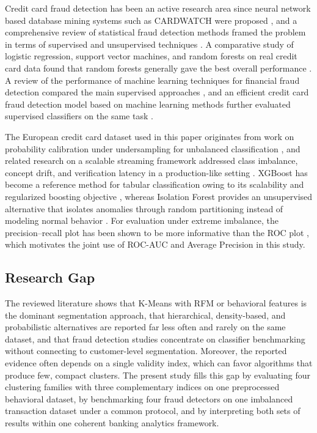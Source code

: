 \documentclass[conference]{IEEEtran}
\begin{document}
Credit card fraud detection has been an active research area since neural network based database mining systems such as CARDWATCH were proposed \cite{aleskerov1997cardwatch}, and a comprehensive review of statistical fraud detection methods framed the problem in terms of supervised and unsupervised techniques \cite{bolton2002statistical}. A comparative study of logistic regression, support vector machines, and random forests on real credit card data found that random forests generally gave the best overall performance \cite{bhattacharyya2011data}. A review of the performance of machine learning techniques for financial fraud detection compared the main supervised approaches \cite{sadgali2019performance}, and an efficient credit card fraud detection model based on machine learning methods further evaluated supervised classifiers on the same task \cite{trivedi2020study}.

The European credit card dataset used in this paper originates from work on probability calibration under undersampling for unbalanced classification \cite{dal2014learned}, and related research on a scalable streaming framework addressed class imbalance, concept drift, and verification latency in a production-like setting \cite{carcillo2018beyond}. XGBoost has become a reference method for tabular classification owing to its scalability and regularized boosting objective \cite{chen2016xgboost}, whereas Isolation Forest provides an unsupervised alternative that isolates anomalies through random partitioning instead of modeling normal behavior \cite{liu2008isolation}. For evaluation under extreme imbalance, the precision--recall plot has been shown to be more informative than the ROC plot \cite{saito2015precision}, which motivates the joint use of ROC-AUC and Average Precision in this study.

\subsection{Research Gap}

The reviewed literature shows that K-Means with RFM or behavioral features is the dominant segmentation approach, that hierarchical, density-based, and probabilistic alternatives are reported far less often and rarely on the same dataset, and that fraud detection studies concentrate on classifier benchmarking without connecting to customer-level segmentation. Moreover, the reported evidence often depends on a single validity index, which can favor algorithms that produce few, compact clusters. The present study fills this gap by evaluating four clustering families with three complementary indices on one preprocessed behavioral dataset, by benchmarking four fraud detectors on one imbalanced transaction dataset under a common protocol, and by interpreting both sets of results within one coherent banking analytics framework.
\end{document}

